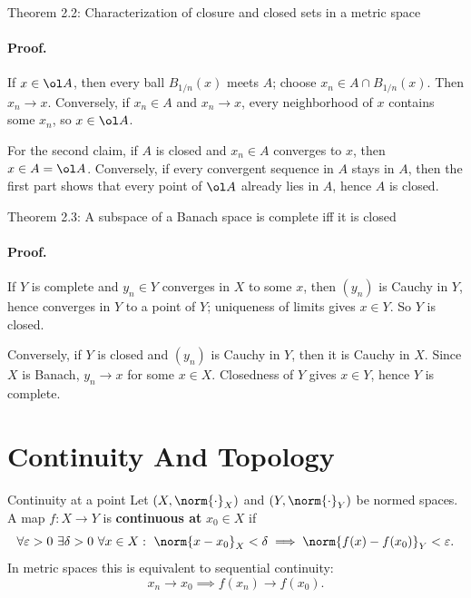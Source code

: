 \documentclass[11pt]{article}
\begin{document}
\begin{thmbox}{Theorem 2.2: Characterization of closure and closed sets in a metric space}
\thmClosureSequential
\end{thmbox}

\paragraph{Proof.}
If $x\in\ol A$, then every ball $B_{1/n}(x)$ meets $A$; choose $x_n\in A\cap B_{1/n}(x)$. Then $x_n\to x$. Conversely, if $x_n\in A$ and $x_n\to x$, every neighborhood of $x$ contains some $x_n$, so $x\in\ol A$.

For the second claim, if $A$ is closed and $x_n\in A$ converges to $x$, then $x\in A=\ol A$. Conversely, if every convergent sequence in $A$ stays in $A$, then the first part shows that every point of $\ol A$ already lies in $A$, hence $A$ is closed.

\begin{thmbox}{Theorem 2.3: A subspace of a Banach space is complete iff it is closed}
\thmSubspaceCompleteIffClosed
\end{thmbox}

\paragraph{Proof.}
If $Y$ is complete and $y_n\in Y$ converges in $X$ to some $x$, then $(y_n)$ is Cauchy in $Y$, hence converges in $Y$ to a point of $Y$; uniqueness of limits gives $x\in Y$. So $Y$ is closed.

Conversely, if $Y$ is closed and $(y_n)$ is Cauchy in $Y$, then it is Cauchy in $X$. Since $X$ is Banach, $y_n\to x$ for some $x\in X$. Closedness of $Y$ gives $x\in Y$, hence $Y$ is complete.

\section{Continuity And Topology}

\begin{defbox}{Continuity at a point}
Let $(X,\norm{\cdot}_X)$ and $(Y,\norm{\cdot}_Y)$ be normed spaces. A map $f:X\to Y$ is \textbf{continuous at} $x_0\in X$ if
\[
\forall \varepsilon>0\ \exists \delta>0\ \forall x\in X:\
\norm{x-x_0}_X<\delta \implies \norm{f(x)-f(x_0)}_Y<\varepsilon.
\]
In metric spaces this is equivalent to sequential continuity:
\[
x_n\to x_0 \implies f(x_n)\to f(x_0).
\]
\end{defbox}
\end{document}
